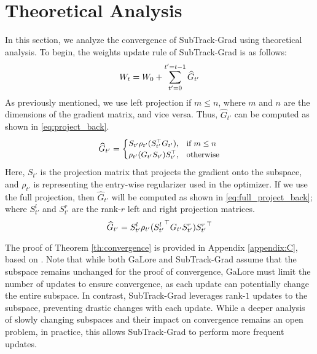 \section{Theoretical Analysis}
\label{sec:theory}
In this section, we analyze the convergence of SubTrack-Grad using theoretical analysis.  To begin, the weights update rule of SubTrack-Grad is as follows:
\begin{equation}
\small
    W_t = W_0 + \sum_{t'=0}^{t'=t-1} \widehat{G}_{t'}
    \label{eq:update_rule}
\end{equation}
As previously mentioned, we use left projection if \(m \leq n\), where \(m\) and \(n\) are the dimensions of the gradient matrix, and vice versa. Thus, \(\widehat{G}_{t'}\) can be computed as shown in \eqref{eq:project_back}.
\begin{equation}
\small
    \widehat{G}_{t'} = 
    \begin{cases}
        S_{t'} \rho_{t'} (S_{t'}^\top G_{t'}), & \text{if \(m \leq n\)} \\
        \rho_{t'} (G_{t'} S_{t'})S_{t'}^\top, & \text{otherwise}
    \end{cases}
    \label{eq:project_back}
\end{equation}
Here, \(S_{t'}\) is the projection matrix that projects the gradient onto the subspace, and \(\rho_{t'}\) is representing the entry-wise regularizer used in the optimizer. If we use the full projection, then \(\widehat{G}_{t'}\) will be computed as shown in \eqref{eq:full_project_back}; where \(S_{t'}^l\) and \(S_{t'}^r\) are the rank-\(r\) left and right projection matrices.
\begin{equation}
\small
    \widehat{G}_{t'} = S_{t'}^l \rho_{t'} ({S_{t'}^l}^\top G_{t'} S_{t'}^r) {S_{t'}^r}^\top
    \label{eq:full_project_back}
\end{equation}



The proof of Theorem \ref{th:convergence} is provided in Appendix \ref{appendix:C}, based on \citet{zhao2024galorememoryefficientllmtraining}. Note that while both GaLore and SubTrack-Grad assume that the subspace remains unchanged for the proof of convergence, GaLore must limit the number of updates to ensure convergence, as each update can potentially change the entire subspace. In contrast, SubTrack-Grad leverages rank-\(1\) updates to the subspace, preventing drastic changes with each update. While a deeper analysis of slowly changing subspaces and their impact on convergence remains an open problem, in practice, this allows SubTrack-Grad to perform more frequent updates.

